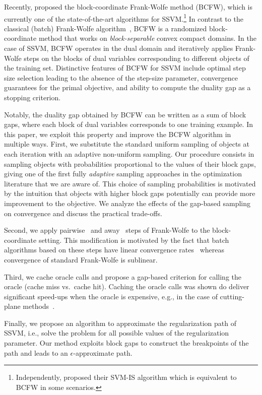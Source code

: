 \documentclass{article}
\begin{document}
Recently, \citet{lacosteJulien13bcfw} proposed the block-coordinate Frank-Wolfe method (BCFW), which is currently one of the state-of-the-art algorithms for SSVM.\footnote{Independently, \citet{branson13} proposed their SVM-IS algorithm which is equivalent to BCFW in some scenarios.}
In contrast to the classical (batch) Frank-Wolfe algorithm~\citep{Frank:1956vp}, BCFW is a randomized block-coordinate method that works on \emph{block-separable} convex compact domains.
%
In the case of SSVM, BCFW operates in the dual domain and iteratively applies Frank-Wolfe steps on the blocks of dual variables corresponding to different objects of the training set.
Distinctive features of BCFW for SSVM include optimal step size selection leading to the absence of the step-size parameter, convergence guarantees for the primal objective, and ability to compute the duality gap as a stopping criterion. 



Notably, the duality gap obtained by BCFW can be written as a sum of block gaps, where each block of dual variables corresponds to one training example.
In this paper, we exploit this property and improve the BCFW algorithm in multiple ways. First, we substitute the standard uniform sampling of objects at each iteration with an adaptive non-uniform sampling.
Our procedure consists in sampling objects with probabilities proportional to the values of their block gaps, giving one of the first fully \emph{adaptive} sampling approaches in the optimization literature that we are aware of.
This choice of sampling probabilities is motivated by the intuition that objects with higher block gaps potentially can provide more improvement to the objective.
We analyze the effects of the gap-based sampling on convergence and discuss the practical trade-offs.

Second, we apply pairwise~\citep{Mitchell:1974uy} and away~\citep{Wolfe:1970wy} steps of Frank-Wolfe to the block-coordinate setting.
This modification is motivated by the fact that batch algorithms based on these steps have linear convergence rates~\citep{LacosteJulien2015linearFW} whereas convergence of standard Frank-Wolfe is sublinear.

Third, we cache oracle calls and propose a gap-based criterion for calling the oracle (cache miss vs.\ cache hit).
Caching the oracle calls was shown do deliver significant speed-ups when the oracle is expensive, e.g., in the case of cutting-plane methods~\cite{Joachims:2009ex}.

Finally, we propose an algorithm to approximate the regularization path of SSVM, i.e., solve the problem for all possible values of the regularization parameter.
Our method exploits block gaps to construct the breakpoints of the path and leads to an $\epsilon$-approximate path.
\end{document}
